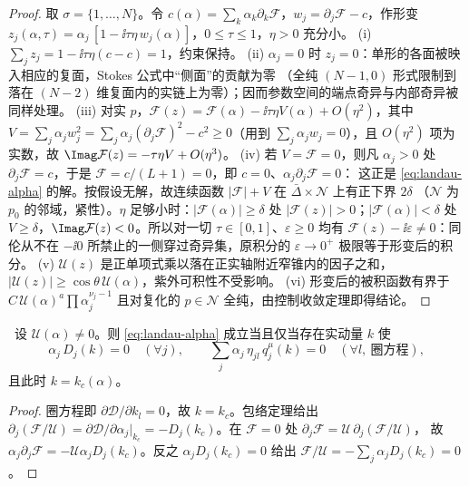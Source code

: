 \begin{proof}
取 $\sigma=\{1,\dots,N\}$。令 $c(\alpha)=\sum_k\alpha_k\partial_k\mathcal F$，$w_j=\partial_j\mathcal F-c$，作形变
$z_j(\alpha,\tau)=\alpha_j\,[1-\ii\tau\eta\,w_j(\alpha)]$，$0\le\tau\le1$，$\eta>0$ 充分小。
(i) $\sum_jz_j=1-\ii\tau\eta(c-c)=1$，约束保持。
(ii) $\alpha_j=0$ 时 $z_j=0$：单形的各面被映入相应的复面，Stokes 公式中“侧面”的贡献为零
（全纯 $(N-1,0)$ 形式限制到落在 $(N-2)$ 维复面内的实链上为零）；因而参数空间的端点奇异与内部奇异被同样处理。
(iii) 对实 $p$，$\mathcal F(z)=\mathcal F(\alpha)-\ii\tau\eta V(\alpha)+O(\eta^2)$，其中
$V=\sum_j\alpha_jw_j^2=\sum_j\alpha_j(\partial_j\mathcal F)^2-c^2\ge0$（用到 $\sum_j\alpha_jw_j=0$），且 $O(\eta^2)$ 项为实数，故
$\Imag\mathcal F(z)=-\tau\eta V+O(\eta^3)$。
(iv) 若 $V=\mathcal F=0$，则凡 $\alpha_j>0$ 处 $\partial_j\mathcal F=c$，于是 $\mathcal F=c/(L+1)=0$，即 $c=0$、$\alpha_j\partial_j\mathcal F=0$：
这正是 \cref{eq:landau-alpha} 的解。按假设无解，故连续函数 $|\mathcal F|+V$ 在 $\bar\Delta\times\mathcal N$ 上有正下界 $2\delta$
（$\mathcal N$ 为 $p_0$ 的邻域，紧性）。$\eta$ 足够小时：$|\mathcal F(\alpha)|\ge\delta$ 处 $|\mathcal F(z)|>0$；$|\mathcal F(\alpha)|<\delta$ 处
$V\ge\delta$，$\Imag\mathcal F(z)<0$。所以对一切 $\tau\in[0,1]$、$\varepsilon\ge0$ 均有 $\mathcal F(z)-\ii\varepsilon\ne0$：同伦从不在 $-\ii0$
所禁止的一侧穿过奇异集，原积分的 $\varepsilon\to0^+$ 极限等于形变后的积分。
(v) $\mathcal U(z)$ 是正单项式乘以落在正实轴附近窄锥内的因子之和，$|\mathcal U(z)|\ge\cos\theta\,\mathcal U(\alpha)$，紫外可积性不受影响。
(vi) 形变后的被积函数有界于 $C\,\mathcal U(\alpha)^{a}\prod\alpha_j^{\nu_j-1}$ 且对复化的 $p\in\mathcal N$ 全纯，由控制收敛定理即得结论。
\end{proof}

\begin{lemma}[两种形式的等价]\label{lem:landau-equiv}\tagR\
设 $\mathcal U(\alpha)\neq0$。则 \cref{eq:landau-alpha} 成立当且仅当存在实动量 $k$ 使
\begin{equation}\label{eq:landau-momentum}
\alpha_j\,D_j(k)=0\quad(\forall j),\qquad \sum_j\alpha_j\,\eta_{jl}\,q_j^\mu(k)=0\quad(\forall l,\ \text{圈方程}),
\end{equation}
且此时 $k=k_c(\alpha)$。
\end{lemma}
\begin{proof}
圈方程即 $\partial\mathcal D/\partial k_l=0$，故 $k=k_c$。包络定理给出
$\partial_j(\mathcal F/\mathcal U)=\partial\mathcal D/\partial\alpha_j|_{k_c}=-D_j(k_c)$。在 $\mathcal F=0$ 处 $\partial_j\mathcal F=\mathcal U\,\partial_j(\mathcal F/\mathcal U)$，
故 $\alpha_j\partial_j\mathcal F=-\mathcal U\alpha_jD_j(k_c)$。反之 $\alpha_jD_j(k_c)=0$ 给出 $\mathcal F/\mathcal U=-\sum_j\alpha_jD_j(k_c)=0$。
\end{proof}

